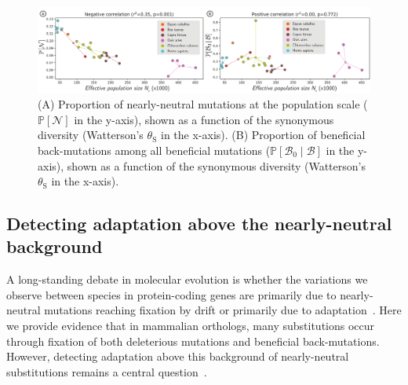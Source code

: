 \documentclass[12pt]{article}
\newcommand{\proba}{\mathbb{P}}
\newcommand{\SphyBen}{\mathcal{B}_0}
\newcommand{\given}{\mid}
\newcommand{\SpopNeu}{\mathcal{N}}
\newcommand{\SpopBen}{\mathcal{B}}
\newcommand{\thetaSyn}{\theta_{\text{S}}}
\begin{document}
\begin{figure}[!ht]
    \centering
    \includegraphics[width=\textwidth, page=1] {artworks/figure.diversity}
    \caption{
        (A) Proportion of nearly-neutral mutations at the population scale ($\proba [ \SpopNeu]$ in the y-axis), shown as a function of the synonymous diversity (Watterson's $\thetaSyn$ in the x-axis).
        (B) Proportion of beneficial back-mutations among all beneficial mutations ($\proba [ \SphyBen  \given  \SpopBen]$ in the y-axis), shown as a function of the synonymous diversity (Watterson's $\thetaSyn$ in the x-axis).
    }
    \label{fig:diversity}
\end{figure}

\subsection*{Detecting adaptation above the nearly-neutral background}

A long-standing debate in molecular evolution is whether the variations we observe between species in protein-coding genes are primarily due to nearly-neutral mutations reaching fixation by drift or primarily due to adaptation~\cite{kimura_evolutionary_1968,kern_neutral_2018,jensen_importance_2019,gillespie_substitution_1994,Ohta1992}.
Here we provide evidence that in mammalian orthologs, many substitutions occur through fixation of both deleterious mutations and beneficial back-mutations.
However, detecting adaptation above this background of nearly-neutral substitutions remains a central question~\cite{kimura_evolutionary_1968,ohta_development_1996}.
\end{document}
